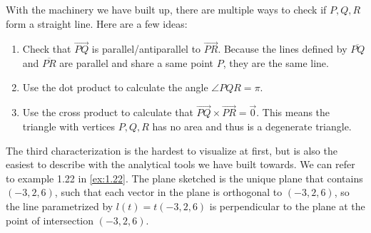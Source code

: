 With the machinery we have built up, there are multiple ways to check if $P,Q,R$ form a straight line. Here are a few ideas:\begin{enumerate}
	\item Check that $\overrightarrow{PQ}$ is parallel/antiparallel to $\overrightarrow{PR}$. Because the lines defined by $\overline{PQ}$ and $\overline{PR}$ are parallel and share a same point $P$, they are the same line.
	\item Use the dot product to calculate the angle $\angle PQR=\pi$.
	\item Use the cross product to calculate that $\overrightarrow{PQ}\times\overrightarrow{PR}=\vec{0}$. This means the triangle with vertices $P,Q,R$ has no area and thus is a degenerate triangle.

\end{enumerate}
\begin{remark}
	The third characterization is the hardest to visualize at first, but is also the easiest to describe with the analytical tools we have built towards. We can refer to example 1.22 in \ref{ex:1.22}. The plane sketched is the unique plane that contains $(-3,2,6)$, such that each vector in the plane is orthogonal to $(-3,2,6)$, so the line parametrized by $l(t)=t(-3,2,6)$ is perpendicular to the plane at the point of intersection $(-3,2,6)$.
\end{remark}

